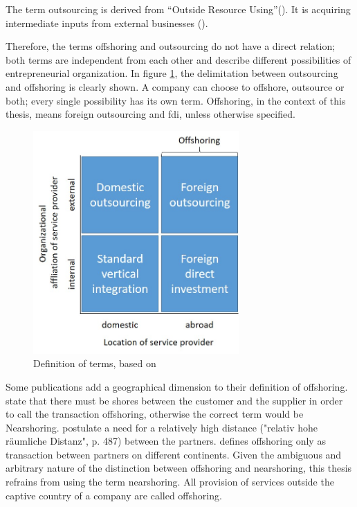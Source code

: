The term outsourcing is derived from ``Outside Resource Using''(\cite[p. 46]{Specht.2007b}). It is acquiring intermediate inputs from external businesses (\cite[p. 46]{Specht.2007b}).

Therefore, the terms offshoring and outsourcing do not have a direct relation; both terms are independent from each other and describe different possibilities of entrepreneurial organization. In figure \ref{fig:DefTerms}, the delimitation between outsourcing and offshoring is clearly shown. A company can choose to offshore, outsource or both; every single possibility has its own term. Offshoring, in the context of this thesis, means foreign outsourcing and \gls{fdi}, unless otherwise specified.

\begin{figure}[htb]
	\centering
	\includegraphics[width=0.7\textwidth]{Pictures/Terms_definition}
	\caption{Definition of terms, based on \cite[pp. 552f]{Antras.2004}}
	\label{fig:DefTerms}
\end{figure}

Some publications add a geographical dimension to their definition of offshoring. \cite{Jahns.2007} state that there must be shores between the customer and the supplier in order to call the transaction offshoring, otherwise the correct term would be Nearshoring. \cite{Cappallo.2006} postulate a need for a relatively high distance ("relativ hohe räumliche Distanz", p. 487) between the partners. \cite{Dressler.2007} defines offshoring only as transaction between partners on different continents. Given the ambiguous and arbitrary nature of the distinction between offshoring and nearshoring, this thesis refrains from using the term nearshoring. All provision of services outside the captive country of a company are called offshoring.

